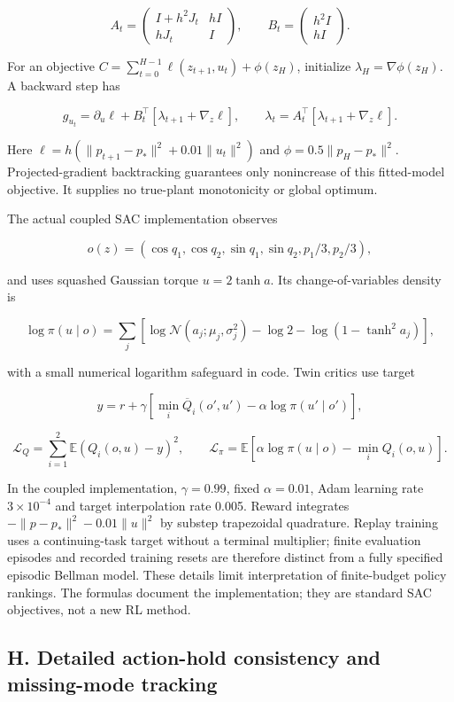 \documentclass[
  10pt,
]{article}
\begin{document}
\[A_t=\begin{pmatrix}I+h^2J_t&hI\\hJ_t&I\end{pmatrix},\qquad
B_t=\begin{pmatrix}h^2I\\hI\end{pmatrix}.\]

For an objective \(C=\sum_{t=0}^{H-1}\ell(z_{t+1},u_t)+\phi(z_H)\),
initialize \(\lambda_H=\nabla\phi(z_H)\). A backward step has

\[g_{u_t}=\partial_u\ell+B_t^\top[\lambda_{t+1}+\nabla_z\ell],\qquad
\lambda_t=A_t^\top[\lambda_{t+1}+\nabla_z\ell].\]

Here \(\ell=h(\|p_{t+1}-p_*\|^2+0.01\|u_t\|^2)\) and
\(\phi=0.5\|p_H-p_*\|^2\). Projected-gradient backtracking guarantees
only nonincrease of this fitted-model objective. It supplies no
true-plant monotonicity or global optimum.

The actual coupled SAC implementation observes

\[o(z)=(\cos q_1,\cos q_2,\sin q_1,\sin q_2,p_1/3,p_2/3),\]

and uses squashed Gaussian torque \(u=2\tanh a\). Its
change-of-variables density is

\[\log\pi(u\mid o)=\sum_j\left[\log\mathcal N(a_j;\mu_j,\sigma_j^2)-\log2-\log(1-\tanh^2a_j)\right],\]

with a small numerical logarithm safeguard in code. Twin critics use
target

\[y=r+\gamma[\min_i\overline Q_i(o',u')-\alpha\log\pi(u'\mid o')],\]

\[\mathcal L_Q=\sum_{i=1}^2\mathbb E(Q_i(o,u)-y)^2,\qquad
\mathcal L_\pi=\mathbb E[\alpha\log\pi(u\mid o)-\min_iQ_i(o,u)].\]

In the coupled implementation, \(\gamma=0.99\), fixed \(\alpha=0.01\),
Adam learning rate \(3\times10^{-4}\) and target interpolation rate
0.005. Reward integrates \(-\|p-p_*\|^2-0.01\|u\|^2\) by substep
trapezoidal quadrature. Replay training uses a continuing-task target
without a terminal multiplier; finite evaluation episodes and recorded
training resets are therefore distinct from a fully specified episodic
Bellman model. These details limit interpretation of finite-budget
policy rankings. The formulas document the implementation; they are
standard SAC objectives, not a new RL method.

\hypertarget{h.-detailed-action-hold-consistency-and-missing-mode-tracking}{%
\subsection*{H. Detailed action-hold consistency and missing-mode
tracking}\label{h.-detailed-action-hold-consistency-and-missing-mode-tracking}}
\end{document}
